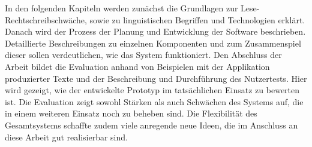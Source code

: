 In den folgenden Kapiteln werden zunächst die Grundlagen zur Lese-Rechtschreibschwäche, sowie zu linguistischen Begriffen und Technologien erklärt. Danach wird der Prozess der Planung und Entwicklung der Software beschrieben. Detaillierte Beschreibungen zu einzelnen Komponenten und zum Zusammenspiel dieser sollen verdeutlichen, wie das System funktioniert. Den Abschluss der Arbeit bildet die Evaluation anhand von Beispielen mit der Applikation produzierter Texte und der Beschreibung und Durchführung des Nutzertests. Hier wird gezeigt, wie der entwickelte Prototyp im tatsächlichen Einsatz zu bewerten ist. Die Evaluation zeigt sowohl Stärken als auch Schwächen des Systems auf, die in einem weiteren Einsatz noch zu beheben sind. Die Flexibilität des Gesamtsystems schaffte zudem viele anregende neue Ideen, die im Anschluss an diese Arbeit gut realisierbar sind.